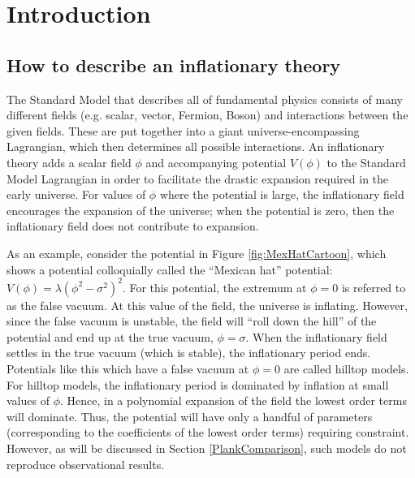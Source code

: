 \documentclass[a4paper,11pt]{article}
\begin{document}
\newpage
\section{Introduction}
\subsection{How to describe an inflationary theory}
\label{sec:GeneralDescription}
The Standard Model that describes all of fundamental physics consists of many different fields (e.g. scalar, vector, Fermion, Boson) and interactions between the given fields. These are put together into a giant universe-encompassing Lagrangian, which then determines all possible interactions. An inflationary theory adds a scalar field $\phi$ and accompanying potential $V(\phi)$ to the Standard Model Lagrangian in order to facilitate the drastic expansion required in the early universe. For values of $\phi$ where the potential is large, the inflationary field encourages the expansion of the universe; when the potential is zero, then the inflationary field does not contribute to expansion. 

As an example, consider the potential in Figure \ref{fig:MexHatCartoon}, which shows a potential colloquially called the ``Mexican hat'' potential: $V(\phi)=\lambda(\phi^2-\sigma^2)^2$. For this potential, the extremum at $\phi=0$ is referred to as the false vacuum. At this value of the field, the universe is inflating. However, since the false vacuum is unstable, the field will ``roll down the hill'' of the potential and end up at the true vacuum, $\phi=\sigma$. When the inflationary field settles in the true vacuum (which is stable), the inflationary period ends. Potentials like this which have a false vacuum at $\phi=0$ are called hilltop models. For hilltop models, the inflationary period is dominated by inflation at small values of $\phi$. Hence, in a polynomial expansion of the field the lowest order terms will dominate. Thus, the potential will have only a handful of parameters (corresponding to the coefficients of the lowest order terms) requiring constraint. However, as will be discussed in Section \ref{PlankComparison}, such models do not reproduce observational results.
\end{document}
